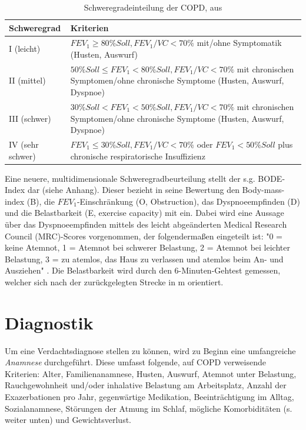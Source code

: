 \begin{table}
\centering
\begin{tabular}{lp{10cm}}
	\textbf{Schweregrad} & \textbf{Kriterien} \\
	\hline \hline
	I (leicht) & $FEV_{1} \ge 80\% Soll, FEV_{1}/VC < 70\%$ \newline mit/ohne Symptomatik (Husten, Auswurf) \\
	\hline
	II (mittel) & $50\% Soll \le FEV_{1} < 80\% Soll, FEV_{1}/VC < 70\%$ \newline mit chronischen Symptomen/ohne chronische Symptome (Husten, Auswurf, Dyspnoe) \\
	\hline
	III (schwer) & $30\% Soll < FEV_{1} < 50\% Soll, FEV_{1}/VC < 70\%$ \newline mit chronischen Symptomen/ohne chronische Symptome (Husten, Auswurf, Dyspnoe) \\
	\hline
	IV (sehr schwer) & $FEV_{1} \le 30\% Soll, FEV_{1}/VC < 70\%$ oder \newline $FEV_{1} < 50\% Soll$ plus chronische respiratorische Insuffizienz \\
	\hline
\end{tabular}
\caption{Schweregradeinteilung der COPD, aus \autocite[e9]{vogelmeier2007}}
\label{tab:copd_schweregrade}
\end{table}

Eine neuere, multidimensionale Schweregradbeurteilung stellt der s.g. BODE-Index dar (siehe Anhang). Dieser bezieht in seine Bewertung den Body-mass-index (B), die $FEV_{1}$-Einschränkung (O, Obstruction), das Dyspnoeempfinden (D) und die Belastbarkeit (E, exercise capacity) mit ein. Dabei wird eine Aussage über das Dyspnoeempfinden mittels des leicht abgeänderten Medical Research Council (MRC)-Scores vorgenommen, der folgendermaßen eingeteilt ist: "0 = keine Atemnot, 1 = Atemnot bei schwerer Belastung, 2 = Atemnot bei leichter Belastung, 3 = zu atemlos, das Haus zu verlassen und atemlos beim An- und Ausziehen" \autocite[186f.]{welte2007}. Die Belastbarkeit wird durch den 6-Minuten-Gehtest gemessen, welcher sich nach der zurückgelegten Strecke in m orientiert.


\section{Diagnostik} %
\label{diagnostik}
Um eine Verdachtsdiagnose stellen zu können, wird zu Beginn eine umfangreiche \emph{Anamnese} durchgeführt. Diese umfasst folgende, auf COPD verweisende Kriterien: Alter, Familienanamnese, Husten, Auswurf, Atemnot unter Belastung, Rauchgewohnheit und/oder inhalative Belastung am Arbeitsplatz, Anzahl der Exazerbationen pro Jahr, gegenwärtige Medikation, Beeinträchtigung im Alltag, Sozialanamnese, Störungen der Atmung im Schlaf, mögliche Komorbiditäten (s. weiter unten) und Gewichtsverlust. 

